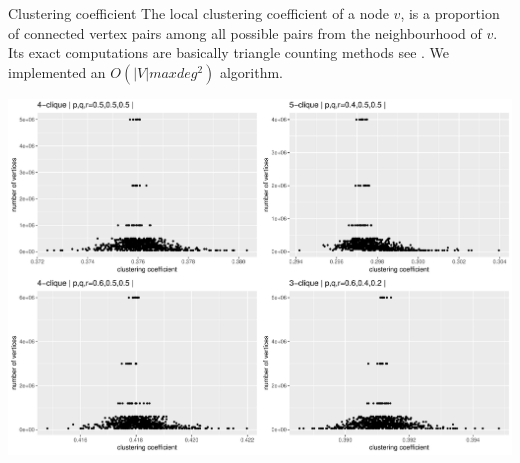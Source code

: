\begin{block}{Clustering coefficient}
\small
  The local clustering coefficient of a node $v$, is a proportion of connected vertex pairs among all possible pairs from the neighbourhood of $v$. Its exact computations are basically triangle counting methods see \cite{Lat}. We implemented an $O(|V|maxdeg^{2})$ algorithm.
  
  \vskip 1cm
  \centering
  \includegraphics[width=0.8\linewidth]{./fig/klikkclust4.pdf}
\end{block}
